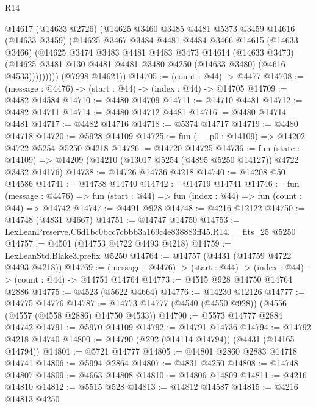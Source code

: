 \begin{lexlean}{R14}
\begin{coremodule}
              @14617
              (@14633 @2726)
              (@14625
                @3460
                @3485
                @4481
                @5373
                @3459
                @14616
                (@14633 @3459)
                (@14625
                  @3467
                  @3484
                  @4481
                  @4484
                  @3466
                  @14615
                  (@14633 @3466)
                  (@14625
                    @3474
                    @3483
                    @4481
                    @4483
                    @3473
                    @14614
                    (@14633 @3473)
                    (@14625 @3481 @130 @4481 @4481 @3480 @4250 (@14633 @3480) (@4616 @4533)))))))))
      (@7998 @14621))
@14705 := (count : @44) -> @4477
@14708 := (message : @4476) -> (start : @44) -> (index : @44) -> @14705
@14709 := @4482 @14584
@14710 := @4480 @14709
@14711 := @14710 @4481
@14712 := @4482 @14711
@14714 := @4480 @14712 @4481
@14716 := @4480 @14714 @4481
@14717 := @4482 @14716
@14718 := @5374 @14717
@14719 := @4480 @14718
@14720 := @5928 @14109
@14725 := fun (__p0 : @14109) => @14202 @4722 @5254 @5250 @4218
@14726 := @14720 @14725
@14736 := fun (state : @14109) =>
  @14209 (@14210 (@13017 @5254 (@4895 @5250 @14127)) @4722 @3432 @14176)
@14738 := @14726 @14736 @4218
@14740 := @14208 @50 @14586
@14741 := @14738 @14740
@14742 := @14719 @14741
@14746 := fun (message : @4476) =>
  fun (start : @44) => fun (index : @44) => fun (count : @44) => @14742
@14747 := @4491 @928
@14748 := @4216 @12122
@14750 := @14748 (@4831 @4667)
@14751 := @14747 @14750
@14753 := LexLeanPreserve.C6d1bc0bcc7cbbb3a169c4e838883ff45.R14.__fits_25 @5250
@14757 := @4501 (@14753 @4722 @4493 @4218)
@14759 := LexLeanStd.Blake3.prefix @5250
@14764 := @14757 (@4431 (@14759 @4722 @4493 @4218))
@14769 := (message : @4476) -> (start : @44) -> (index : @44) -> (count : @44) -> @14751 @14764
@14773 := @4515 @928 @14750 @14764 @2886
@14775 := @4523 (@5622 @4664)
@14776 := @14230 @12126
@14777 := @14775 @14776
@14787 := @14773 @14777 (@4540 (@4550 @928)) (@4556 (@4557 (@4558 @2886) @14750 @4533))
@14790 := @5573 @14777 @2884 @14742
@14791 := @5970 @14109
@14792 := @14791 @14736
@14794 := @14792 @4218 @14740
@14800 := @14790 (@292 (@14114 @14794)) (@4431 (@14165 @14794))
@14801 := @5721 @14777
@14805 := @14801 @2860 @2883 @14718 @14741
@14806 := @5994 @2864
@14807 := @4831 @4250
@14808 := @14748 @14807
@14809 := @4663 @14808
@14810 := @14806 @14809
@14811 := @4216 @14810
@14812 := @5515 @528
@14813 := @14812 @14587
@14815 := @4216 @14813 @4250

\end{coremodule}
\end{lexlean}
